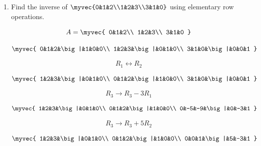 \begin{enumerate}[label=\thesubsection.\arabic*, ref=\thesubsection.\theenumi]
    The symmetric matrix has eigenvectors $\vec q_1=(1,1)^T$ and $\vec q_2=(1,-1)^T$. Their eigenvalues are
    \begin{align*}
        \lambda_1 & =\cos\theta+\sin\theta. \\
        \lambda_2 & =\cos\theta-\sin\theta.
    \end{align*}

    $\det A=\lambda_1\lambda_2$ and raises each eigenvalue to the $n$th power. Using the determinant-power identity,
    \begin{align*}
        \det(A^n) & =(\det A)^n.
	    \tag*{\eqref{formula:C12-Q28}}
    \end{align*}

    \par
    We obtain
    \begin{align*}
        \det(A^n) & =(\lambda_1\lambda_2)^n
        =\bigl((\cos\theta+\sin\theta)(\cos\theta-\sin\theta)\bigr)^n
        =(\cos2\theta)^n.
    \end{align*}


    \item
    \label{question:C12-Q30}
    \label{question-short:C12-Q30} Find the inverse of $\myvec{0&1&2\\1&2&3\\3&1&0}$ using elementary row operations.

    \par
    \smallskip
    \solution

\[
A=\myvec{
0&1&2\\
1&2&3\\
3&1&0
}
\]

\[
\myvec{
0&1&2&\big|&1&0&0\\
1&2&3&\big|&0&1&0\\
3&1&0&\big|&0&0&1
}
\]

\[
R_1\leftrightarrow R_2
\]

\[
\myvec{
1&2&3&\big|&0&1&0\\
0&1&2&\big|&1&0&0\\
3&1&0&\big|&0&0&1
}
\]

\[
R_3\rightarrow R_3-3R_1
\]

\[
\myvec{
1&2&3&\big|&0&1&0\\
0&1&2&\big|&1&0&0\\
0&-5&-9&\big|&0&-3&1
}
\]

\[
R_3\rightarrow R_3+5R_2
\]

\[
\myvec{
1&2&3&\big|&0&1&0\\
0&1&2&\big|&1&0&0\\
0&0&1&\big|&5&-3&1
}
\]


\end{enumerate}
